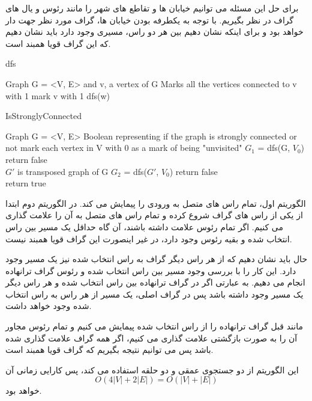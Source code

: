 \documentclass{article}
\begin{document}
برای حل این مسئله می توانیم خیابان ها و تقاطع های شهر را مانند رئوس و یال های گراف در نظر بگیریم.
با توجه به یکطرفه بودن خیابان ها، گراف مورد نظر جهت دار خواهد بود و برای اینکه نشان دهیم بین هر دو راس،
مسیری وجود دارد باید نشان دهیم که این گراف قویا همبند است.
\begin{latin}
    \begin{algorithm}[H]
        \caption*{dfs}
        \begin{algorithmic}
            \Require Graph G = <V, E> and v, a vertex of G
            \Ensure Marks all the vertices connected to v with 1
            \State mark v with 1
                    \State dfs(w)
                \EndIf
            \EndFor
        \end{algorithmic}
    \end{algorithm}
\end{latin}

\begin{latin}
    \begin{algorithm}[H]
        \caption*{IsStronglyConnected}
        \begin{algorithmic}
            \Require Graph G = <V, E>
            \Ensure Boolean representing if the graph is strongly connected or not
            \State mark each vertex in V with 0 as a mark of being "unvisited"
            \State $G_1$ = dfs(G, $V_0$)
                    \State return false
                \EndIf
            \EndFor
            \\
            \State $G'$ is transposed graph of G
            \State $G_2$ = dfs($G'$, $V_0$)
                \State return false
            \EndIf
            \EndFor
            \\
            \State return true
        \end{algorithmic}
    \end{algorithm}
\end{latin}

الگوریتم اول، تمام راس های متصل به ورودی را پیمایش می کند.
در الگوریتم دوم ابتدا از یکی از راس های گراف شروع کرده و تمام راس های متصل به آن را
علامت گذاری می کنیم. اگر تمام رئوس علامت داشته باشند، آن گاه حداقل یک مسیر بین راس انتخاب شده و بقیه رئوس وجود دارد،
در غیر اینصورت این گراف قویا همبند نیست.

حال باید نشان دهیم که از هر راس دیگر گراف به راس انتخاب شده نیز یک مسیر وجود دارد.
این کار را با بررسی وجود مسیر بین راس انتخاب شده و رئوس گراف ترانهاده انجام می دهیم.
به عبارتی اگر در گراف ترانهاده بین راس انتخاب شده و هر راس دیگر یک مسیر وجود داشته باشد پس در گراف اصلی،
یک مسیر از هر راس به راس انتخاب شده وجود خواهد داشت.

مانند قبل گراف ترانهاده را از راس انتخاب شده پیمایش می کنیم و تمام رئوس مجاور آن را به صورت بازگشتی علامت گذاری می کنیم،
اگر همه گراف علامت گذاری شده باشد پس می توانیم نتیجه بگیریم که گراف قویا همبند است.

این الگوریتم از دو جستجوی عمقی و دو حلقه استفاده می کند، پس کارایی زمانی آن
$$O(4|V| + 2|E|) = O(|V| + |E|)$$
خواهد بود.
\end{document}
